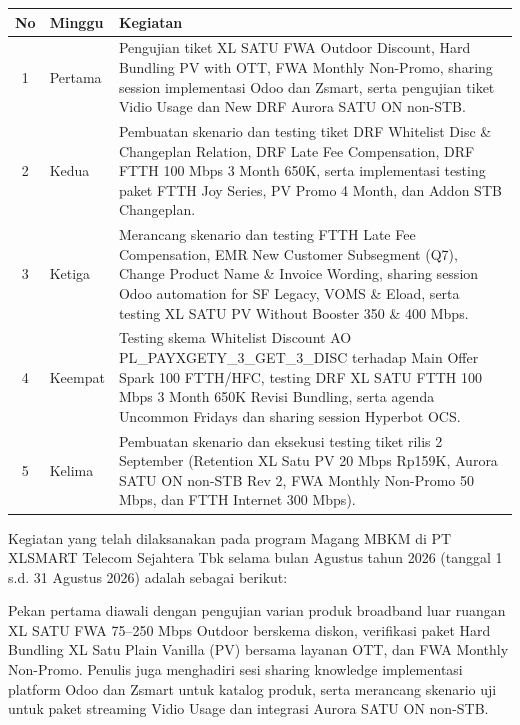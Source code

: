 \documentclass[12pt,a4paper]{article}
\begin{document}
\vspace{0.2cm}
\begin{singlespace}
\noindent
\begin{tabular}{|c|p{2.0cm}|p{11.5cm}|}
\hline
\textbf{No} & \textbf{Minggu} & \textbf{Kegiatan} \\
\hline
1 & Pertama & Pengujian tiket XL SATU FWA Outdoor Discount, Hard Bundling PV with OTT, FWA Monthly Non-Promo, sharing session implementasi Odoo dan Zsmart, serta pengujian tiket Vidio Usage dan New DRF Aurora SATU ON non-STB. \\
\hline
2 & Kedua & Pembuatan skenario dan testing tiket DRF Whitelist Disc \& Changeplan Relation, DRF Late Fee Compensation, DRF FTTH 100 Mbps 3 Month 650K, serta implementasi testing paket FTTH Joy Series, PV Promo 4 Month, dan Addon STB Changeplan. \\
\hline
3 & Ketiga & Merancang skenario dan testing FTTH Late Fee Compensation, EMR New Customer Subsegment (Q7), Change Product Name \& Invoice Wording, sharing session Odoo automation for SF Legacy, VOMS \& Eload, serta testing XL SATU PV Without Booster 350 \& 400 Mbps. \\
\hline
4 & Keempat & Testing skema Whitelist Discount AO PL\_PAYXGETY\_3\_GET\_3\_DISC terhadap Main Offer Spark 100 FTTH/HFC, testing DRF XL SATU FTTH 100 Mbps 3 Month 650K Revisi Bundling, serta agenda Uncommon Fridays dan sharing session Hyperbot OCS. \\
\hline
5 & Kelima & Pembuatan skenario dan eksekusi testing tiket rilis 2 September (Retention XL Satu PV 20 Mbps Rp159K, Aurora SATU ON non-STB Rev 2, FWA Monthly Non-Promo 50 Mbps, dan FTTH Internet 300 Mbps). \\
\hline
\end{tabular}
\end{singlespace}

\clearpage
\noindent Kegiatan yang telah dilaksanakan pada program Magang MBKM di PT XLSMART Telecom Sejahtera Tbk selama bulan Agustus tahun 2026 (tanggal 1 s.d. 31 Agustus 2026) adalah sebagai berikut:

Pekan pertama diawali dengan pengujian varian produk broadband luar ruangan XL SATU FWA 75--250 Mbps Outdoor berskema diskon, verifikasi paket Hard Bundling XL Satu Plain Vanilla (PV) bersama layanan OTT, dan FWA Monthly Non-Promo. Penulis juga menghadiri sesi sharing knowledge implementasi platform Odoo dan Zsmart untuk katalog produk, serta merancang skenario uji untuk paket streaming Vidio Usage dan integrasi Aurora SATU ON non-STB.
\end{document}
